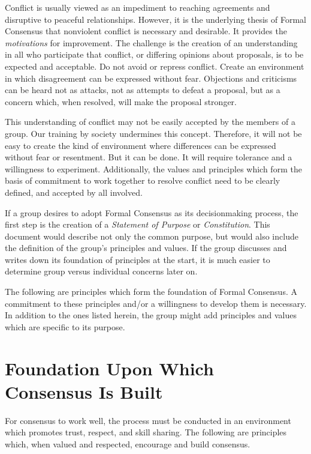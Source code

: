 Conflict is usually viewed as an impediment to reaching agreements and disruptive to peaceful relationships. However, it is the underlying thesis of Formal Consensus that nonviolent conflict is necessary and desirable. It provides the \emph{motivations} for improvement. The challenge is the creation of an understanding in all who participate that conflict, or differing opinions about proposals, is to be expected and acceptable. Do not avoid or repress conflict. Create an environment in which disagreement can be expressed without fear. Objections and criticisms can be heard not as attacks, not as attempts to defeat a proposal, but as a concern which, when resolved, will make the proposal stronger.

This understanding of conflict may not be easily accepted by the members of a group. Our training by society undermines this concept. Therefore, it will not be easy to create the kind of environment where differences can be expressed without fear or resentment. But it can be done. It will require tolerance and a willingness to experiment. Additionally, the values and principles which form the basis of commitment to work together to resolve conflict need to be clearly defined, and accepted by all involved.

If a group desires to adopt Formal Consensus as its decisionmaking process, the first step is the creation of a \emph{Statement of Purpose} or \emph{Constitution}. This document would describe not only the common purpose, but would also include the definition of the group's principles and values. If the group discusses and writes down its foundation of principles at the start, it is much easier to determine group versus individual concerns later on.

The following are principles which form the foundation of Formal Consensus. A commitment to these principles and/or a willingness to develop them is necessary. In addition to the ones listed herein, the group might add principles and values which are specific to its purpose.

\section[Foundations of Consensus]{Foundation Upon Which\\ Consensus Is Built}

For consensus to work well, the process must be conducted in an environment which promotes trust, respect, and skill sharing. The following are principles which, when valued and respected, encourage and build consensus.

